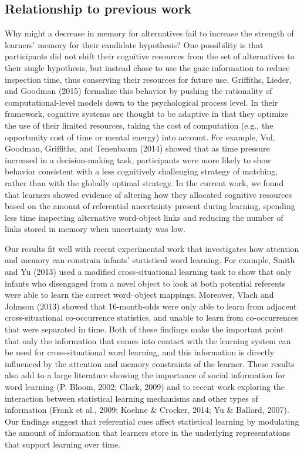 \documentclass[oneside]{report}
\begin{document}
\subsection{Relationship to previous
work}\label{relationship-to-previous-work}

Why might a decrease in memory for alternatives fail to increase the
strength of learners' memory for their candidate hypothesis? One
possibility is that participants did not shift their cognitive resources
from the set of alternatives to their single hypothesis, but instead
chose to use the gaze information to reduce inspection time, thus
conserving their resources for future use. Griffiths, Lieder, and
Goodman (2015) formalize this behavior by pushing the rationality of
computational-level models down to the psychological process level. In
their framework, cognitive systems are thought to be adaptive in that
they optimize the use of their limited resources, taking the cost of
computation (e.g., the opportunity cost of time or mental energy) into
account. For example, Vul, Goodman, Griffiths, and Tenenbaum (2014)
showed that as time pressure increased in a decision-making task,
participants were more likely to show behavior consistent with a less
cognitively challenging strategy of matching, rather than with the
globally optimal strategy. In the current work, we found that learners
showed evidence of altering how they allocated cognitive resources based
on the amount of referential uncertainty present during learning,
spending less time inspecting alternative word-object links and reducing
the number of links stored in memory when uncertainty was low.

Our results fit well with recent experimental work that investigates how
attention and memory can constrain infants' statistical word learning.
For example, Smith and Yu (2013) used a modified cross-situational
learning task to show that only infants who disengaged from a novel
object to look at both potential referents were able to learn the
correct word--object mappings. Moreover, Vlach and Johnson (2013) showed
that 16-month-olds were only able to learn from adjacent
cross-situational co-occurrence statistics, and unable to learn from
co-occurrences that were separated in time. Both of these findings make
the important point that only the information that comes into contact
with the learning system can be used for cross-situational word
learning, and this information is directly influenced by the attention
and memory constraints of the learner. These results also add to a large
literature showing the importance of social information for word
learning (P. Bloom, 2002; Clark, 2009) and to recent work exploring the
interaction between statistical learning mechanisms and other types of
information (Frank et al., 2009; Koehne \& Crocker, 2014; Yu \& Ballard,
2007). Our findings suggest that referential cues affect statistical
learning by modulating the amount of information that learners store in
the underlying representations that support learning over time.
\end{document}

